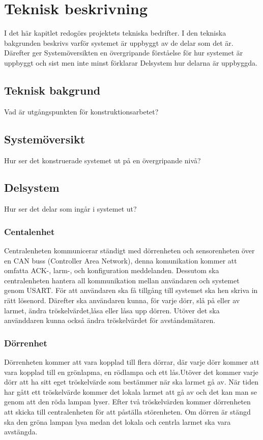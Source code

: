 \documentclass{article}
\begin{document}
\section{Teknisk beskrivning}
I det här kapitlet redogörs projektets tekniska bedrifter. 
I den tekniska bakgrunden beskrivs varför systemet är uppbyggt av de delar som det är.
Därefter ger Systemöversikten en övergripande förståelse för hur systemet är uppbyggt och sist men inte minst förklarar Delsystem hur delarna är uppbyggda.


\subsection{Teknisk bakgrund}
Vad är utgångspunkten för konstruktionsarbetet?

\subsection{Systemöversikt}
Hur ser det konstruerade systemet ut på en övergripande nivå?

\subsection{Delsystem}
Hur ser det delar som ingår i systemet ut?
\subsubsection{Centalenhet}
Centralenheten kommunicerar ständigt med dörrenheten och sensorenheten över en CAN buss (Controller Area Network), denna komunikation kommer att omfatta ACK-, larm-, och konfiguration meddelanden. Dessutom ska centralenheten hantera all kommunikation mellan användaren och systemet genom USART. För att användaren ska få tillgång till systemet ska hen skriva in rätt lösenord. Därefter ska användaren kunna, för varje dörr, slå på eller av larmet, ändra tröskelvärdet,låsa eller låsa upp dörren. Utöver det ska använddaren kunna också ändra tröskelvärdet för avståndsmätaren.



\subsubsection{Dörrenhet}

Dörrenheten kommer att vara kopplad till flera dörrar, där varje dörr kommer att vara kopplad till en grönlapma, en rödlampa och ett lås.Utöver det kommer varje dörr att ha sitt eget tröskelvärde som bestämmer när ska larmet gå av. När tiden har gått ett tröskelvärde kommer det lokala larmet att gå av och det kan man se genom att den röda lampan lyser. Efter två tröskelvärden kommer dörrenheten att skicka till centralenheten för att påställa störenheten. Om dörren är stängd ska den gröna lampan lysa medan det lokala och centrla larmet ska vara avstängda. 
\end{document}
